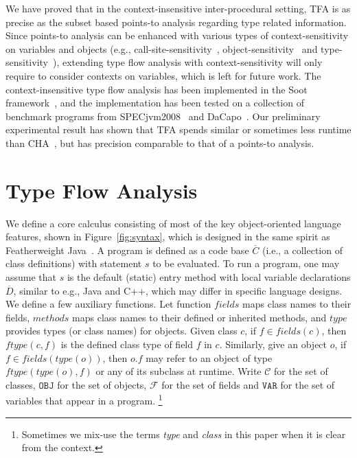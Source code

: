 \documentclass[runningheads]{llncs}
\newcommand{\keyword}[1]{\mathsf{#1}}
\newcommand{\kwnull}[0]{\keyword{null}}
\newcommand\Var{\mathtt{VAR}}
\newcommand\Val{\mathtt{V}}
\newcommand\Obj{\mathtt{OBJ}}
\newcommand{\Class}{\mathcal{C}}
\newcommand{\Field}{\mathcal{F}}
\newcommand\set[1]{\{#1\}}
\begin{document}
We have proved that in the context-insensitive inter-procedural setting, TFA is as precise as the subset based points-to analysis regarding type related information. Since points-to analysis can be enhanced with various types of context-sensitivity on variables and objects (e.g., call-site-sensitivity~\cite{Shivers91,Kastrinis2013}, object-sensitivity~\cite{Milanova2005,Smaragdakis11,Tan16} and type-sensitivity~\cite{Smaragdakis11}), extending type flow analysis with context-sensitivity will only require to consider contexts on variables, which is left for future work. The context-insensitive type flow analysis has been implemented in the Soot framework~\cite{soot}, and the implementation has been tested on a collection of benchmark programs from SPECjvm2008~\cite{specjvm} and DaCapo~\cite{Blackburn2006}. %
Our preliminary experimental result has shown that TFA spends similar or sometimes less runtime than CHA~\cite{Dean1995}, but has precision comparable to that of a points-to analysis.

\section{Type Flow Analysis}\label{sec:type-flow-analysis}

We define a core calculus consisting of most of the key object-oriented language features, shown in Figure~\ref{fig:syntax}, which is designed in the same spirit as Featherweight Java~\cite{Igarashi2001}.
A program is defined as a code base $\overline{C}$ (i.e., a collection of class definitions) with statement $s$ to be evaluated.
To run a program, one may assume that $s$ is the default (static) entry method with local variable declarations $\overline{D}$,
similar to e.g., Java and C++, which may differ in specific language designs.
We define a few auxiliary functions. Let function $fields$ maps class names to their fields, $methods$ maps class names to their defined or inherited methods, and $type$ provides types (or class names) for objects. Given class $c$, if $f\in fields(c)$, then $ftype(c,f)$ is the defined class type of field $f$ in $c$. Similarly, give an object $o$, if $f\in fields(type(o))$, then $o.f$ may refer to an object of type $ftype(type(o),f)$ or %
any of its subclass at runtime. Write $\Class$ for the set of classes, $\Obj$ for the set of objects, $\Field$ for the set of fields and $\Var$ for the set of variables that appear in a program.
\footnote{Sometimes we mix-use the terms \emph{type} and \emph{class} in this paper when it is clear from the context.}
\end{document}
